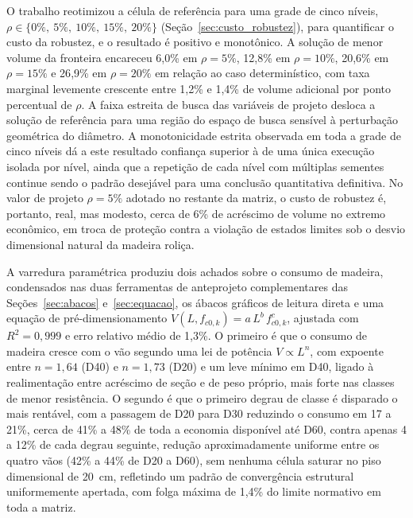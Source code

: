 O trabalho reotimizou a célula de referência para uma grade de cinco níveis, $\rho \in \{0\%,\ 5\%,\ 10\%,\ 15\%,\ 20\%\}$ (Seção~\ref{sec:custo_robustez}), para quantificar o custo da robustez, e o resultado é positivo e monotônico. A solução de menor volume da fronteira encareceu 6{,}0\% em $\rho = 5\%$, 12{,}8\% em $\rho = 10\%$, 20{,}6\% em $\rho = 15\%$ e 26{,}9\% em $\rho = 20\%$ em relação ao caso determinístico, com taxa marginal levemente crescente entre 1{,}2\% e 1{,}4\% de volume adicional por ponto percentual de $\rho$.
A faixa estreita de busca das variáveis de projeto desloca a solução de referência para uma região do espaço de busca sensível à perturbação geométrica do diâmetro.
A monotonicidade estrita observada em toda a grade de cinco níveis dá a este resultado confiança superior à de uma única execução isolada por nível, ainda que a repetição de cada nível com múltiplas sementes continue sendo o padrão desejável para uma conclusão quantitativa definitiva.
No valor de projeto $\rho = 5\%$ adotado no restante da matriz, o custo de robustez é, portanto, real, mas modesto, cerca de 6\% de acréscimo de volume no extremo econômico, em troca de proteção contra a violação de estados limites sob o desvio dimensional natural da madeira roliça.


A varredura paramétrica produziu dois achados sobre o consumo de madeira, condensados nas duas ferramentas de anteprojeto complementares das Seções~\ref{sec:abacos} e~\ref{sec:equacao}, os ábacos gráficos de leitura direta e uma equação de pré-dimensionamento $V(L, f_{c0,k}) = a\,L^{b}\,f_{c0,k}^{c}$, ajustada com $R^2 = 0{,}999$ e erro relativo médio de 1{,}3\%.
O primeiro é que o consumo de madeira cresce com o vão segundo uma lei de potência $V \propto L^{n}$, com expoente entre $n = 1{,}64$ (D40) e $n = 1{,}73$ (D20) e um leve mínimo em D40, ligado à realimentação entre acréscimo de seção e de peso próprio, mais forte nas classes de menor resistência.
O segundo é que o primeiro degrau de classe é disparado o mais rentável, com a passagem de D20 para D30 reduzindo o consumo em 17 a 21\%, cerca de 41\% a 48\% de toda a economia disponível até D60, contra apenas 4 a 12\% de cada degrau seguinte, redução aproximadamente uniforme entre os quatro vãos (42\% a 44\% de D20 a D60), sem nenhuma célula saturar no piso dimensional de 20~cm, refletindo um padrão de convergência estrutural uniformemente apertada, com folga máxima de 1{,}4\% do limite normativo em toda a matriz.

